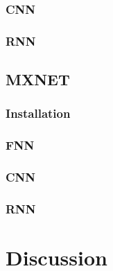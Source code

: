 \documentclass[6pt,letter]{article}\usepackage[]{graphicx}\usepackage[]{color}
\begin{document}
\subsubsection{CNN}
\subsubsection{RNN}

\subsection{MXNET}
\subsubsection{Installation}
\subsubsection{FNN}
\subsubsection{CNN}
\subsubsection{RNN}

\section{Discussion}

\newpage
\pagestyle{plain}

\end{document}
